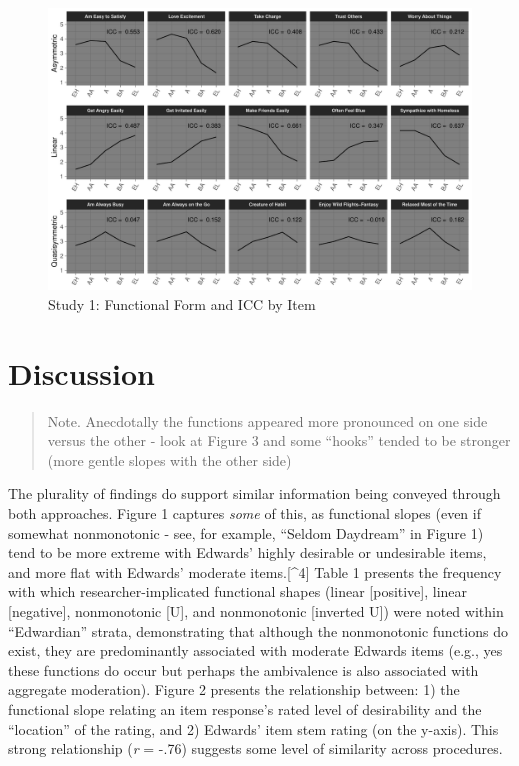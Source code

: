 \documentclass[
  ,jou]{apa6}
\begin{document}
\begin{figure}
\centering
\includegraphics{FullStudy_files/figure-latex/Figure6-1.pdf}
\caption{\label{fig:Figure6}Study 1: Functional Form and ICC by Item}
\end{figure}

\section{Discussion}\label{discussion}

\begin{quote}
Note. Anecdotally the functions appeared more pronounced on one side versus the other - look at Figure 3 and some ``hooks'' tended to be stronger (more gentle slopes with the other side)
\end{quote}

The plurality of findings do support similar information being conveyed through both approaches. Figure 1 captures \emph{some} of this, as functional slopes (even if somewhat nonmonotonic - see, for example, ``Seldom Daydream'' in Figure 1) tend to be more extreme with Edwards' highly desirable or undesirable items, and more flat with Edwards' moderate items.{[}\^{}4{]} Table 1 presents the frequency with which researcher-implicated functional shapes (linear {[}positive{]}, linear {[}negative{]}, nonmonotonic {[}U{]}, and nonmonotonic {[}inverted U{]}) were noted within ``Edwardian'' strata, demonstrating that although the nonmonotonic functions do exist, they are predominantly associated with moderate Edwards items (e.g., yes these functions do occur but perhaps the ambivalence is also associated with aggregate moderation). Figure 2 presents the relationship between: 1) the functional slope relating an item response's rated level of desirability and the ``location'' of the rating, and 2) Edwards' item stem rating (on the y-axis). This strong relationship (\emph{r} = -.76) suggests some level of similarity across procedures.
\end{document}
